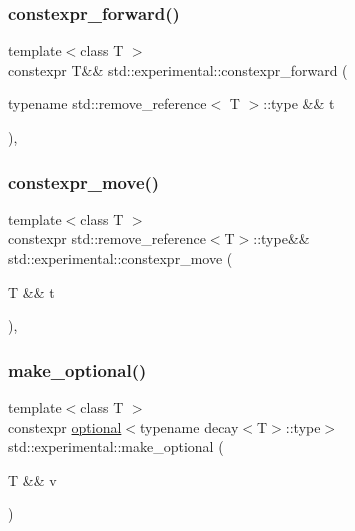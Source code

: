 \subsubsection{\texorpdfstring{constexpr\+\_\+forward()}{constexpr\_forward()}\hspace{0.1cm}{\footnotesize\ttfamily [2/2]}}
{\footnotesize\ttfamily template$<$class T $>$ \\
constexpr T\&\& std\+::experimental\+::constexpr\+\_\+forward (\begin{DoxyParamCaption}\item[{typename std\+::remove\+\_\+reference$<$ T $>$\+::type \&\&}]{t }\end{DoxyParamCaption})\hspace{0.3cm}{\ttfamily [inline]}, {\ttfamily [noexcept]}}

\mbox{\label{namespacestd_1_1experimental_abe16b4d69976581fbfc135b809b3ffe3}} 
\subsubsection{\texorpdfstring{constexpr\+\_\+move()}{constexpr\_move()}}
{\footnotesize\ttfamily template$<$class T $>$ \\
constexpr std\+::remove\+\_\+reference$<$T$>$\+::type\&\& std\+::experimental\+::constexpr\+\_\+move (\begin{DoxyParamCaption}\item[{T \&\&}]{t }\end{DoxyParamCaption})\hspace{0.3cm}{\ttfamily [inline]}, {\ttfamily [noexcept]}}

\mbox{\label{namespacestd_1_1experimental_aa6c8db3625ec5a8e7f6288fb5adf8f95}} 
\subsubsection{\texorpdfstring{make\+\_\+optional()}{make\_optional()}\hspace{0.1cm}{\footnotesize\ttfamily [1/2]}}
{\footnotesize\ttfamily template$<$class T $>$ \\
constexpr \mbox{\hyperlink{classstd_1_1experimental_1_1optional}{optional}}$<$typename decay$<$T$>$\+::type$>$ std\+::experimental\+::make\+\_\+optional (\begin{DoxyParamCaption}\item[{T \&\&}]{v }\end{DoxyParamCaption})}

